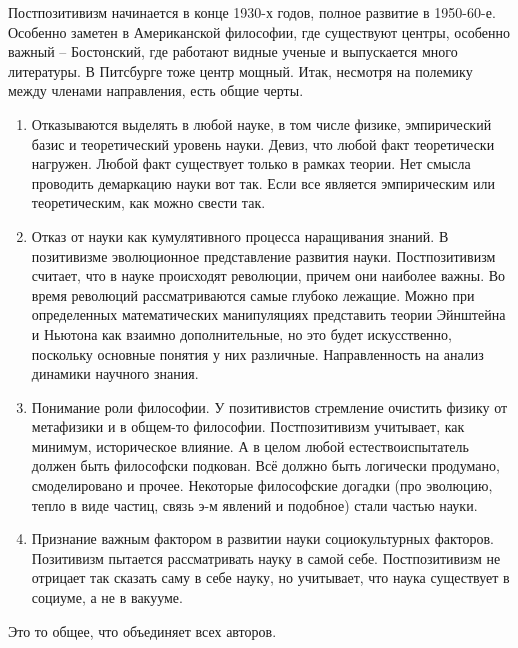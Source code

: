 \documentclass[a4paper, 12pt]{article}
\begin{document}
Постпозитивизм начинается в конце 1930-х годов, полное развитие 
в 1950-60-е. Особенно заметен в Американской философии, где существуют 
центры, особенно важный -- Бостонский, где работают видные ученые 
и выпускается много литературы. В Питсбурге тоже центр мощный. Итак, 
несмотря на полемику между членами направления, есть общие черты.
\begin{enumerate}
  \item Отказываются выделять в любой науке, в том числе физике, 
    эмпирический базис и теоретический уровень науки. Девиз, что любой 
    факт теоретически нагружен. Любой факт существует только в рамках 
    теории. Нет смысла проводить демаркацию науки вот так. Если все 
    является эмпирическим или теоретическим, как можно свести так.
  \item Отказ от науки как кумулятивного процесса наращивания знаний. 
    В позитивизме эволюционное представление развития науки. 
    Постпозитивизм считает, что в науке происходят революции, причем они 
    наиболее важны. Во время революций рассматриваются самые глубоко 
    лежащие. Можно при определенных математических манипуляциях 
    представить теории Эйнштейна и Ньютона как взаимно дополнительные, 
    но это будет искусственно, поскольку основные понятия у них 
    различные. Направленность на анализ динамики научного знания.
  \item Понимание роли философии. У позитивистов стремление очистить 
    физику от метафизики и в общем-то философии. Постпозитивизм 
    учитывает, как минимум, историческое влияние. А в целом любой 
    естествоиспытатель должен быть философски подкован. Всё должно быть 
    логически продумано, смоделировано и прочее. Некоторые философские 
    догадки (про эволюцию, тепло в виде частиц, связь э-м явлений 
    и подобное) стали частью науки.
  \item Признание важным фактором в развитии науки социокультурных 
    факторов. Позитивизм пытается рассматривать науку в самой себе. 
    Постпозитивизм не отрицает так сказать саму в себе науку, но 
    учитывает, что наука существует в социуме, а не в вакууме.
\end{enumerate}
Это то общее, что объединяет всех авторов.
\end{document}
